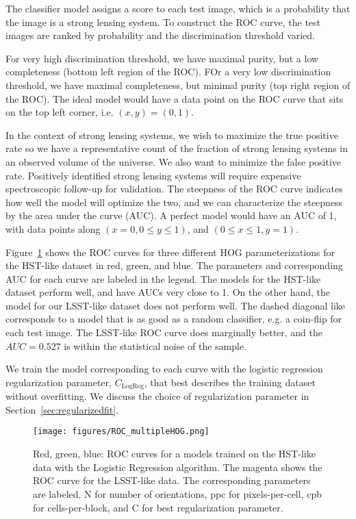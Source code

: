 \documentclass{emulateapj}
\begin{document}
The classifier model assigns a score to each test image, which is a
probability that the image is a strong lensing system.  To construct
the ROC curve, the test images are ranked by probability and the
discrimination threshold varied.  

For very high discrimination threshold, we have maximal purity, but a
low completeness (bottom left region of the ROC).  FOr a very low
discrimination threshold, we have maximal completeness, but minimal
purity (top right region of the ROC).  The ideal model would have a
data point on the ROC curve that sits on the top left corner,
i.e. $(x, y) = (0, 1)$.

In the context of strong lensing systems, we wish to maximize the true
positive rate so we have a representative count of the fraction of
strong lensing systems in an observed volume of the universe.  We also
want to minimize the false positive rate.  Positively identified
strong lensing systems will require expensive spectroscopic follow-up
for validation.  The steepness of the ROC curve indicates how well the
model will optimize the two, and we can characterize the steepness by
the area under the curve (AUC).  A perfect model would have an AUC of
1, with data points along $(x=0, 0\leq y\leq1)$, and $(0\leq x\leq 1,
y=1)$.

Figure~\ref{fig:ROC} shows the ROC curves for three different HOG
parameterizations for the HST-like dataset in red, green, and blue.
The parameters and corresponding AUC for each curve are labeled in the
legend.  The models for the HST-like dataset perform well, and have
AUCs very close to 1.  On the other hand, the model for our LSST-like
dataset does not perform well.  The dashed diagonal like corresponds
to a model that is as good as a random classifier, e.g. a coin-flip
for each test image.  The LSST-like ROC curve does marginally better,
and the $AUC=0.527$ is within the statistical noise of the sample.

We train the model corresponding to each curve with the logistic
regression regularization parameter, $C_\text{LogReg}$, that best
describes the training dataset without overfitting.  We discuss the
choice of regularization parameter in
Section~\ref{sec:regularizedfit}.

\begin{figure}[t]\label{fig:ROC}
\begin{center}
\texttt{[image: figures/ROC\_multipleHOG.png]}
\caption{Red, green, blue: ROC curves for a models trained on the
  HST-like data with the Logistic Regression algorithm.  The magenta
  shows the ROC curve for the LSST-like data.  The corresponding
  parameters are labeled, N for number of orientations, ppc for
  pixels-per-cell, cpb for cells-per-block, and C for best
  regularization parameter.  }
\end{center}
\end{figure}
\end{document}
